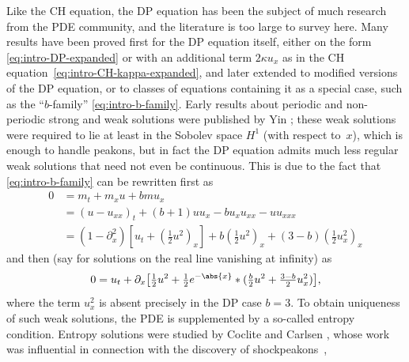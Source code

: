 \documentclass[10pt,a4paper]{article} \pdfoutput=1 
\begin{document}
Like the CH equation, the DP equation has been the subject of much research from the PDE community,
and the literature is too large to survey here.
Many results have been proved first for the DP equation itself,
either on the form \eqref{eq:intro-DP-expanded} or with an additional term $2 \kappa u_x$ as
in the CH equation~\eqref{eq:intro-CH-kappa-expanded},
and later extended to modified versions of the DP equation,
or to classes of equations containing it as a special case,
such as the ``$b$-family'' \eqref{eq:intro-b-family}.
Early results about periodic and non-periodic strong and weak solutions
were published by Yin
\cite{yin:2003:DP-cauchy-problem:Illinois,
  yin:2003:DP-global-existence-for-new-periodic-integrable-equation,
  yin:2004:DP-global-solutions:Indiana,
  yin:2004:DP-global-weak-solutions-for-new-periodic-integrable-equation-with-peakons};
these weak solutions were required to lie at least in the Sobolev space $H^1$ (with respect to~$x$),
which is enough to handle peakons,
but in fact the DP equation admits much less regular weak solutions
that need not even be continuous.
This is due to the fact that \eqref{eq:intro-b-family} can be rewritten first as
\begin{equation}
  \label{eq:b-family1}
  \begin{split}
    0&=m_t+m_x u+bmu_x
    \\
    &= (u-u_{xx})_t + (b+1)uu_x - b u_x u_{xx} - uu_{xxx}
    \\
    &= (1-\partial_x^2)[u_t+(\tfrac12 u^2)_x] + b (\tfrac12 u^2)_x + (3-b) (\tfrac12 u_x^2)_x
  \end{split}
\end{equation}
and then (say for solutions on the real line vanishing at infinity) as
\begin{equation}
  \label{eq:b-family2}
  0 = u_t + \partial_x \bigl[ \tfrac12 u^2 + \tfrac12 e^{-\abs{x}} * (\tfrac{b}{2} u^2 + \tfrac{3-b}{2} u_x^2) \bigr]
  ,
\end{equation}
where the term $u_x^2$ is absent precisely in the DP case $b=3$.
To obtain uniqueness of such weak solutions, the PDE is supplemented by a so-called entropy condition.
Entropy solutions were studied by Coclite and Carlsen
\cite{coclite-karlsen:2006:DPwellposedness,
  coclite-karlsen:2006:DP-semigroup-of-solutions,
  coclite-karlsen:2007:DPuniqueness,
  coclite-karlsen:2008:DP-bounded-solutions,
  coclite-karlsen:2015:periodic-DP-wellposedness-and-asymptotics},
whose work was influential in connection with the discovery of shockpeakons~\cite{lundmark:2007:DP-shockpeakons},
\end{document}
